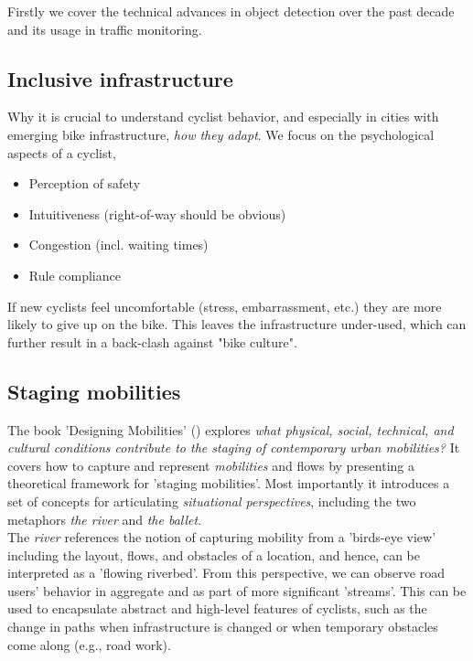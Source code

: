 \color{red}
Firstly we cover the technical advances in object detection over the past decade and its usage in traffic monitoring.
\color{black}

\color{red}
\subsection{Inclusive infrastructure}
Why it is crucial to understand cyclist behavior, and especially in cities with emerging bike infrastructure, \textit{how they adapt}.
We focus on the psychological aspects of a cyclist,

\begin{itemize}
	\item Perception of safety
	\item Intuitiveness (right-of-way should be obvious)
	\item Congestion (incl. waiting times)
	\item Rule compliance
\end{itemize}

If new cyclists feel uncomfortable (stress, embarrassment, etc.) they are more likely to give up on the bike. This leaves the infrastructure 
under-used, which can further result in a back-clash against "bike culture". 
\ \\

\color{black}
\subsection{Staging mobilities}
The book 'Designing Mobilities' (\cite{designinig_mobilities}) explores \textit{what physical, social, technical, 
and cultural conditions contribute to the staging of contemporary urban mobilities?} 
It covers how to capture and represent \textit{mobilities} and flows by presenting a theoretical framework for 'staging mobilities'. 
Most importantly it introduces a set of concepts for articulating \textit{situational perspectives}, 
including the two metaphors \textit{the river} and \textit{the ballet}. 
 \ \\

 The \textit{river} references the notion of capturing mobility from a 'birds-eye view' including the layout, 
 flows, and obstacles of a location, and hence, can be interpreted as a 'flowing riverbed'. 
 From this perspective, we can observe road users' behavior in aggregate and as part of more significant 'streams'. 
 This can be used to encapsulate abstract and high-level features of cyclists, such as the change in paths
 when infrastructure is changed or when temporary obstacles come along (e.g., road work).
 \ \\

